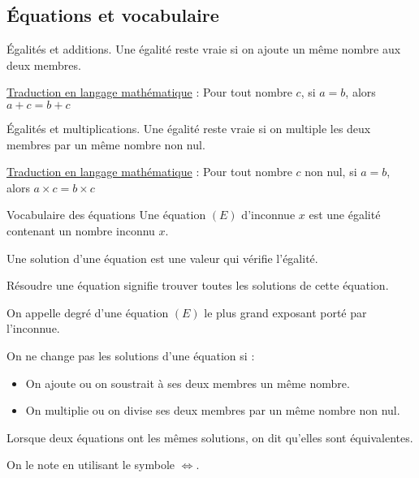 
\begin{pageCours} %


\section{Équations et vocabulaire}

\begin{PpT}{Égalités et additions.}
Une égalité reste vraie si on ajoute un même nombre aux deux membres.

\underline{Traduction en langage mathématique} :  Pour tout nombre $c$, si $a=b$, alors $a+c=b+c$
\end{PpT}

\begin{PpT}{Égalités et multiplications.}
Une égalité reste vraie si on multiple les deux membres par un même nombre non nul.

\underline{Traduction en langage mathématique} :  Pour tout nombre $c$ non nul, si $a=b$, alors $a\times c=b\times c$ 
\end{PpT}

\begin{DefT}{Vocabulaire des équations}
Une équation $(E)$ d'inconnue $x$ est une égalité contenant un nombre inconnu $x$.

Une solution d'une équation est une valeur qui vérifie l'égalité.

Résoudre une équation signifie trouver toutes les solutions de cette équation.
\end{DefT}

\begin{Def}
On appelle degré d'une équation $(E)$ le plus grand exposant porté par l'inconnue.
\end{Def}

\begin{Pp}
On ne change pas les solutions d'une équation si :
\begin{itemize}
\item On ajoute ou on soustrait à ses deux membres un même nombre.
\item On multiplie ou on divise ses deux membres par un même nombre non nul.
\end{itemize}
\end{Pp}

\begin{Def}
Lorsque deux équations ont les mêmes solutions, on dit qu'elles sont équivalentes.

On le note en utilisant le symbole $\Leftrightarrow$.
\end{Def}

\end{pageCours} %

